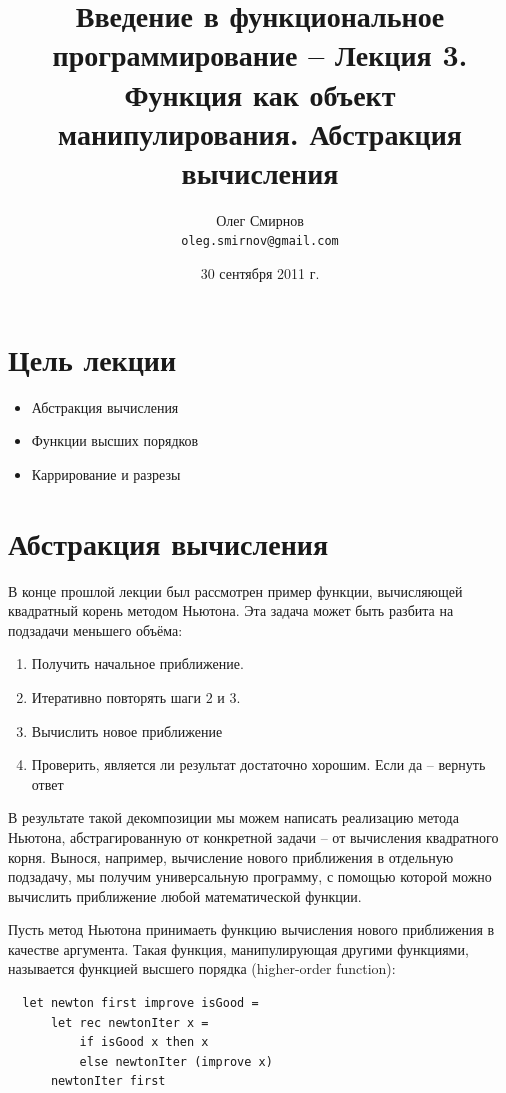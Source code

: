 \documentclass[a4paper,11pt]{article}
\author{Олег Смирнов\\
\texttt{oleg.smirnov@gmail.com}}
\date{30 сентября 2011 г.}
\title{Введение в функциональное программирование -- Лекция 3. Функция как 
объект манипулирования. Абстракция вычисления}
\begin{document}
\maketitle
\tableofcontents
\newpage

\section*{Цель лекции}
\begin{itemize}
\item Абстракция вычисления
\item Функции высших порядков
\item Каррирование и разрезы
\end{itemize}

\section{Абстракция вычисления}
В конце прошлой лекции был рассмотрен пример функции, вычисляющей квадратный
корень методом Ньютона. Эта задача может быть разбита на подзадачи меньшего
объёма:

\begin{enumerate}
\item Получить начальное приближение.
\item Итеративно повторять шаги $2$ и $3$.
\item Вычислить новое приближение
\item Проверить, является ли результат достаточно хорошим. Если да -- вернуть
ответ
\end{enumerate}

В результате такой декомпозиции мы можем написать реализацию метода Ньютона,
абстрагированную от конкретной задачи -- от вычисления квадратного корня.
Вынося, например, вычисление нового приближения в отдельную подзадачу, мы 
получим универсальную программу, с помощью которой можно вычислить приближение
любой математической функции.

Пусть метод Ньютона принимаеть функцию вычисления нового приближения в качестве
аргумента. Такая функция, манипулирующая другими функциями, называется функцией
высшего порядка (higher-order function):

\begin{lstlisting}
  let newton first improve isGood =
      let rec newtonIter x = 
          if isGood x then x
          else newtonIter (improve x)
      newtonIter first
\end{lstlisting}
\end{document}
